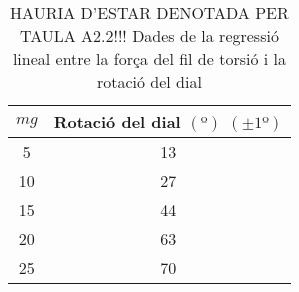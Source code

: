 \begin{multicols}{2}
	\begin{table}
		\centering
		\caption{HAURIA D'ESTAR DENOTADA PER TAULA A2.2!!! Dades de la regressió lineal entre la força del fil de torsió i la rotació del dial}
		\vspace{0,2cm}
		\begin{tabular}{|c|c|}
			\hline
			\text{Massa} $\si{mg}$ & \textbf{Rotació del dial $(º)$ $(\pm1º)$}\\ \hline
			5 & 13 \\ \hline
			10 & 27 \\ \hline
			15 & 44 \\ \hline
			20 & 63 \\ \hline
			25 & 70 \\ \hline
		\end{tabular}
	\end{table}

\end{multicols}
